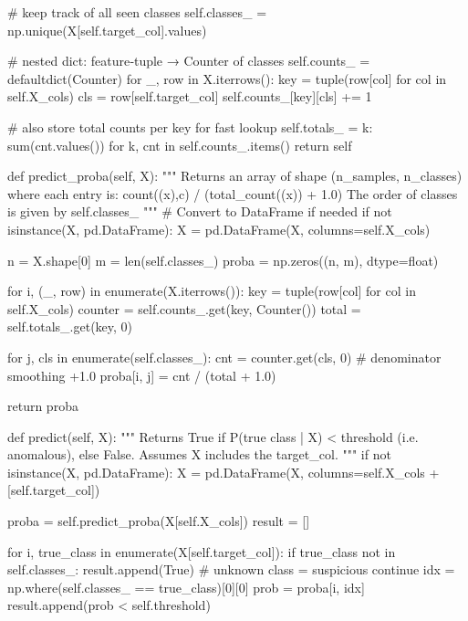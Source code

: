 {{        # keep track of all seen classes
        self.classes_ = np.unique(X[self.target_col].values)

        # nested dict: feature‐tuple → Counter of classes
        self.counts_ = defaultdict(Counter)
        for _, row in X.iterrows():
            key = tuple(row[col] for col in self.X_cols)
            cls = row[self.target_col]
            self.counts_[key][cls] += 1

        # also store total counts per key for fast lookup
        self.totals_ = {k: sum(cnt.values()) for k, cnt in self.counts_.items()}
        return self

    def predict_proba(self, X):
        """
        Returns an array of shape (n_samples, n_classes)
        where each entry is:
          count((x),c) / (total_count((x)) + 1.0)
        The order of classes is given by self.classes_
        """
        # Convert to DataFrame if needed
        if not isinstance(X, pd.DataFrame):
            X = pd.DataFrame(X, columns=self.X_cols)

        n = X.shape[0]
        m = len(self.classes_)
        proba = np.zeros((n, m), dtype=float)

        for i, (_, row) in enumerate(X.iterrows()):
            key = tuple(row[col] for col in self.X_cols)
            counter = self.counts_.get(key, Counter())
            total = self.totals_.get(key, 0)

            for j, cls in enumerate(self.classes_):
                cnt = counter.get(cls, 0)
                # denominator smoothing +1.0
                proba[i, j] = cnt / (total + 1.0)

        return proba

    def predict(self, X):
        """
        Returns True if P(true class | X) < threshold (i.e. anomalous),
        else False.
        Assumes X includes the target_col.
        """
        if not isinstance(X, pd.DataFrame):
            X = pd.DataFrame(X, columns=self.X_cols + [self.target_col])

        proba = self.predict_proba(X[self.X_cols])
        result = []

        for i, true_class in enumerate(X[self.target_col]):
            if true_class not in self.classes_:
                result.append(True)  # unknown class = suspicious
                continue
            idx = np.where(self.classes_ == true_class)[0][0]
            prob = proba[i, idx]
            result.append(prob < self.threshold)

}}

